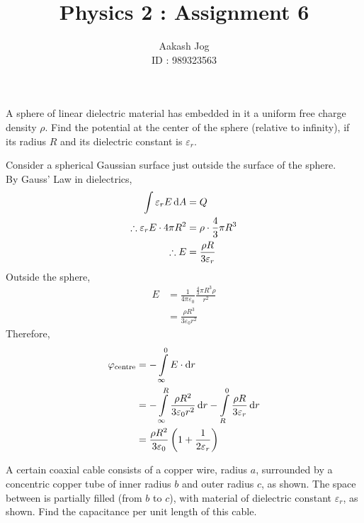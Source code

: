\documentclass[fleqn, a4paper, 11pt, oneside]{amsart}
\title{Physics 2 : Assignment 6}
\author
{
	Aakash Jog\\
	ID : 989323563
}
\date{\formatdate{6}{5}{2015}}
\theoremstyle{definition}
\theoremstyle{theorem}
\begin{document}
\maketitle

\begin{question}
	A sphere of linear dielectric material has embedded in it a uniform free charge density $\rho$.
	Find the potential at the center of the sphere (relative to infinity), if its radius $R$ and its dielectric constant is $\varepsilon_r$.
\end{question}

\begin{solution}
	Consider a spherical Gaussian surface just outside the surface of the sphere.\\
	By Gauss' Law in dielectrics,
	\begin{align*}
		\int \varepsilon_r E \dif A &= Q\\
		\therefore \varepsilon_r E \cdot 4 \pi R^2 &= \rho \cdot \frac{4}{3} \pi R^3\\
		\therefore E &= \frac{\rho R}{3 \varepsilon_r}
	\end{align*}
	Outside the sphere,
	\begin{align*}
		E &= \frac{1}{4 \pi \varepsilon_0} \frac{\frac{4}{3} \pi R^3 \rho}{r^2}\\
		&= \frac{\rho R^3}{3 \varepsilon_0 r^2}
	\end{align*}
	Therefore,
	\begin{align*}
		\varphi_{\textnormal{centre}} &= -\int\limits_{\infty}^{0} E \cdot \dif r\\
		&= -\int\limits_{\infty}^{R} \frac{\rho R^2}{3 \varepsilon_0 r^2} \dif r - \int\limits_{R}^{0} \frac{\rho R}{3 \varepsilon_r} \dif r\\
		&= \frac{\rho R^2}{3 \varepsilon_0} \left( 1 + \frac{1}{2 \varepsilon_r} \right)
	\end{align*}
\end{solution}

\begin{question}
	A certain coaxial cable consists of a copper wire, radius $a$, surrounded by a concentric copper tube of inner radius $b$ and outer radius $c$, as shown.
	The space between is partially filled (from $b$ to $c$), with material of dielectric constant $\varepsilon_r$, as shown.
	Find the capacitance per unit length of this cable.
	\begin{figure}[H]
	\end{figure}
\end{question}
\end{document}
